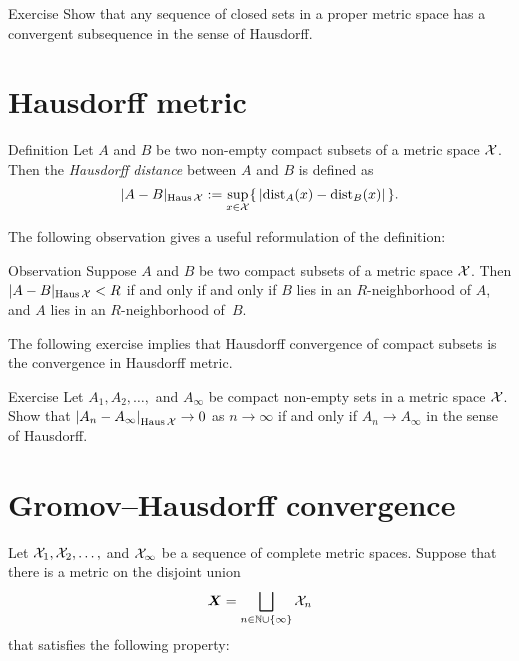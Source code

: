 \begin{thm}{Exercise}\label{ex:generalized-selection}
Show that any sequence of closed sets in a proper metric space has a convergent subsequence in the sense of Hausdorff.
\end{thm}

\section{Hausdorff metric}

\begin{thm}{Definition}\label{def:hausdorff-convergence}
Let $A$ and $B$ be two non-empty compact subsets of a metric space $\mathcal{X}$.
Then the \emph{Hausdorff distance} between $A$ and $B$ is defined as 
$$|A-B|_{\operatorname{\rm Haus}\nolimits\mathcal{X}}
\mathrel{:=}
\sup_{x\in \mathcal{X}}\{\,|\mathrm{dist}_A(x)-\mathrm{dist}_B(x)|\,\}.
$$

\end{thm}

The following observation gives a useful reformulation of the definition:

\begin{thm}{Observation}\label{obs:Haus-nbhds}
Suppose $A$ and $B$ be two compact subsets of a metric space $\mathcal{X}$.
Then $|A-B|_{\operatorname{\rm Haus}\nolimits\mathcal{X}}< R$ if and only if and only if 
$B$ lies in an $R$-neighborhood of $A$, 
and 
$A$ lies in an $R$-neighborhood of~$B$.
\end{thm}

The following exercise implies that Hausdorff convergence of compact subsets is the convergence in Hausdorff metric.

\begin{thm}{Exercise}\label{ex:Haus-conv}
Let $A_1,A_2,\dots,$ and $A_\infty$ be compact non-empty sets in a metric space $\mathcal{X}$.
Show that $|{A_n}-{A_\infty}|_{\operatorname{\rm Haus}\nolimits\mathcal{X}}^{{}}\to 0$ as $n\to\infty$
if and only if $A_n\to A_\infty$ in the sense of Hausdorff.
\end{thm}

\section{Gromov--Hausdorff convergence}\label{sec:Gromov--Hausdorff}

Let $\mathcal{X}_1,\mathcal{X}_2,\dots,$ and $\mathcal{X}_\infty$ be a sequence of complete metric spaces.
Suppose that there is a metric on the disjoint union 
\[\bm{X}=\bigsqcup_{n\in \mathbb{N}\cup\{\infty\}} \mathcal{X}_n\] 
that satisfies the following property:

